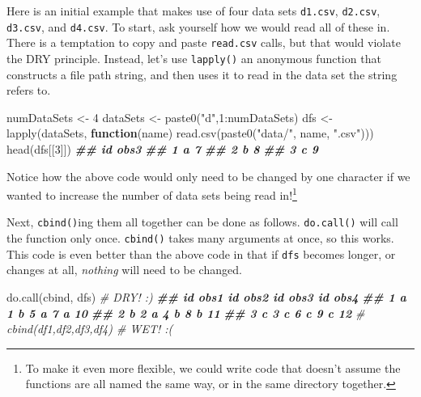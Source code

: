 \documentclass[
  12pt,
  krantz2]{krantz}
\makeatletter
\newenvironment{Shaded}{\begin{snugshade}}{\end{snugshade}}
\newcommand{\CommentTok}[1]{\textcolor[rgb]{0.37,0.37,0.37}{\textit{#1}}}
\newcommand{\ControlFlowTok}[1]{\textcolor[rgb]{0.27,0.27,0.27}{\textbf{#1}}}
\newcommand{\DecValTok}[1]{\textcolor[rgb]{0.06,0.06,0.06}{#1}}
\newcommand{\DocumentationTok}[1]{\textcolor[rgb]{0.37,0.37,0.37}{\textbf{\textit{#1}}}}
\newcommand{\FunctionTok}[1]{\textcolor[rgb]{0,0,0}{#1}}
\newcommand{\NormalTok}[1]{#1}
\newcommand{\OtherTok}[1]{\textcolor[rgb]{0.37,0.37,0.37}{#1}}
\newcommand{\SpecialCharTok}[1]{\textcolor[rgb]{0,0,0}{#1}}
\newcommand{\StringTok}[1]{\textcolor[rgb]{0.5,0.5,0.5}{#1}}
\newenvironment{kframe}{%
\medskip{}
\setlength{\fboxsep}{.8em}
 \def\at@end@of@kframe{}%
 \ifinner\ifhmode%
  \def\at@end@of@kframe{\end{minipage}}%
  \begin{minipage}{\columnwidth}%
 \fi\fi%
 \def\FrameCommand##1{\hskip\@totalleftmargin \hskip-\fboxsep
 \colorbox{shadecolor}{##1}\hskip-\fboxsep
     \hskip-\linewidth \hskip-\@totalleftmargin \hskip\columnwidth}%
 \MakeFramed {\advance\hsize-\width
   \@totalleftmargin\z@ \linewidth\hsize
   \@setminipage}}%
 {\par\unskip\endMakeFramed%
 \at@end@of@kframe}
\renewenvironment{Shaded}{\begin{kframe}}{\end{kframe}}
\makeatother
\begin{document}
Here is an initial example that makes use of four data sets \texttt{d1.csv}, \texttt{d2.csv}, \texttt{d3.csv}, and \texttt{d4.csv}. To start, ask yourself how we would read all of these in. There is a temptation to copy and paste \texttt{read.csv} calls, but that would violate the DRY principle. Instead, let's use \texttt{lapply()} an anonymous function that constructs a file path string, and then uses it to read in the data set the string refers to.

\begin{Shaded}
\begin{Highlighting}[]
\NormalTok{numDataSets }\OtherTok{\textless{}{-}} \DecValTok{4}
\NormalTok{dataSets }\OtherTok{\textless{}{-}} \FunctionTok{paste0}\NormalTok{(}\StringTok{"d"}\NormalTok{,}\DecValTok{1}\SpecialCharTok{:}\NormalTok{numDataSets)}
\NormalTok{dfs }\OtherTok{\textless{}{-}} \FunctionTok{lapply}\NormalTok{(dataSets, }
              \ControlFlowTok{function}\NormalTok{(name) }\FunctionTok{read.csv}\NormalTok{(}\FunctionTok{paste0}\NormalTok{(}\StringTok{"data/"}\NormalTok{, name, }\StringTok{".csv"}\NormalTok{)))}
\FunctionTok{head}\NormalTok{(dfs[[}\DecValTok{3}\NormalTok{]])}
\DocumentationTok{\#\#   id obs3}
\DocumentationTok{\#\# 1  a    7}
\DocumentationTok{\#\# 2  b    8}
\DocumentationTok{\#\# 3  c    9}
\end{Highlighting}
\end{Shaded}

Notice how the above code would only need to be changed by one character if we wanted to increase the number of data sets being read in!\footnote{To make it even more flexible, we could write code that doesn't assume the functions are all named the same way, or in the same directory together.}

Next, \texttt{cbind()}ing them all together can be done as follows. \texttt{do.call()} will call the function only once. \texttt{cbind()} takes many arguments at once, so this works. This code is even better than the above code in that if \texttt{dfs} becomes longer, or changes at all, \emph{nothing} will need to be changed.

\begin{Shaded}
\begin{Highlighting}[]
\FunctionTok{do.call}\NormalTok{(cbind, dfs) }\CommentTok{\# DRY! :)}
\DocumentationTok{\#\#   id obs1 id obs2 id obs3 id obs4}
\DocumentationTok{\#\# 1  a    1  b    5  a    7  a   10}
\DocumentationTok{\#\# 2  b    2  a    4  b    8  b   11}
\DocumentationTok{\#\# 3  c    3  c    6  c    9  c   12}
\CommentTok{\# cbind(df1,df2,df3,df4) \# WET! :(}
\end{Highlighting}
\end{Shaded}
\end{document}
